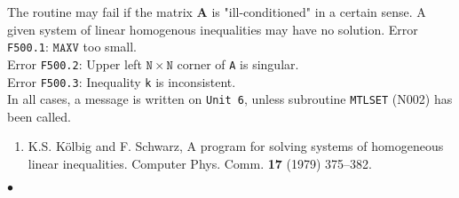 The routine may fail if the matrix {\bf A} is "ill-conditioned" in a
certain sense.
\Notes
A given system of linear homogenous inequalities may have no solution.
\Errorh
Error {\tt F500.1}: $\mathtt{MAXV}$ too small. \\
Error {\tt F500.2}: Upper left $\mathtt{N \times N}$ corner of {\tt A}
is singular. \\
Error {\tt F500.3}: Inequality {\tt k} is inconsistent. \\
In all cases, a message is written on
{\tt Unit 6}, unless subroutine {\tt MTLSET} (N002) has been called.
\Refer
\begin{enumerate}
\item K.S. K\"olbig and F. Schwarz, A program for solving systems of
homogeneous linear inequalities. Computer Phys. Comm. {\bf 17} (1979)
375--382.
\end{enumerate}
$\bullet$
